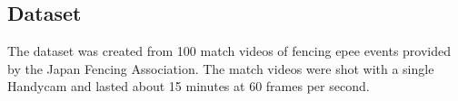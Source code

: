 \subsection{Dataset}
The dataset was created from 100 match videos of fencing epee events provided by the Japan Fencing Association. The match videos were shot with a single Handycam and lasted about 15 minutes at 60 frames per second.

